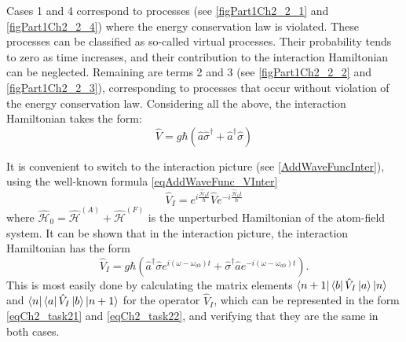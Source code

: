 Cases 1 and 4 correspond to processes (see \autoref{figPart1Ch2_2_1} and
\ref{figPart1Ch2_2_4}) where the energy conservation law is violated.
These processes can be classified as so-called virtual processes. Their
probability tends to zero as time increases, and
their contribution to the interaction Hamiltonian can be
neglected. Remaining are terms 2 and 3 (see \autoref{figPart1Ch2_2_2} and
\ref{figPart1Ch2_2_3}), corresponding to processes
that occur without violation of the energy conservation law. Considering all the above, the interaction Hamiltonian takes the form: 
\begin{equation}
\hat{V} = g \hbar \left(
\hat{a}\hat{\sigma}^{\dag} + 
\hat{a}^{\dag}\hat{\sigma}
\right)
\end{equation}

It is convenient to switch to the interaction picture (see \autoref{AddWaveFuncInter}),
using the well-known 
formula \eqref{eqAddWaveFunc_VInter}
\begin{equation}
\hat{V}_I = 
e^{i \frac{\hat{\mathcal{H}}_0 t}{\hbar}}
\hat{V}
e^{- i \frac{\hat{\mathcal{H}}_0 t}{\hbar}}
\label{eqCh2_task21}
\end{equation}
where 
\(
\hat{\mathcal{H}}_0 = 
\hat{\mathcal{H}}^{\left(A\right)} +
\hat{\mathcal{H}}^{\left(F\right)}
\)
is the unperturbed Hamiltonian of the atom-field system. It can be shown that in
the interaction picture, the interaction Hamiltonian has the form 
\begin{equation}
\hat{V}_I = 
g \hbar \left(
\hat{a}^{\dag}\hat{\sigma} e^{i \left(\omega - \omega_{ab}\right)t} +
\hat{\sigma}^{\dag} \hat{a} e^{-i \left(\omega - \omega_{ab}\right)t}
\right).
\label{eqCh2_task22}
\end{equation}
This is most easily done by calculating the matrix elements 
$\left<n +
1\right|\bra{b}\hat{V}_I\ket{a}\ket{n}$ and
$\bra{n}\bra{a}\hat{V}_I\ket{b}\left|n +
1\right>$ for the operator $\hat{V}_I$, which can be represented in
the form \eqref{eqCh2_task21} and \eqref{eqCh2_task22}, and verifying that they
are the same in both cases.